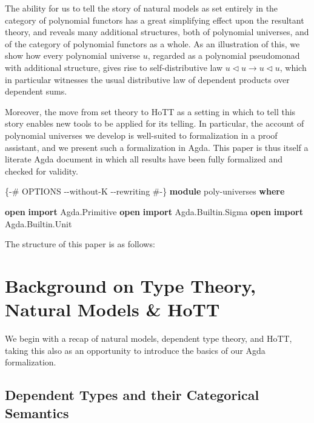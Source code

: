 \documentclass[
  11pt,
  oneside,
  article]{memoir}
\newenvironment{Shaded}{}{}
\newcommand{\KeywordTok}[1]{\textcolor[rgb]{0.00,0.44,0.13}{\textbf{#1}}}
\newcommand{\NormalTok}[1]{#1}
\newcommand{\OtherTok}[1]{\textcolor[rgb]{0.00,0.44,0.13}{#1}}
\newcommand{\PreprocessorTok}[1]{\textcolor[rgb]{0.74,0.48,0.00}{#1}}
\theoremstyle{definition}
\theoremstyle{plain}
\newcommand{\0}{\textsf{0}}
\newcommand{\1}{\tn{\textsf{1}}}
\newcommand{\tri}{\mathbin{\triangleleft}}
\begin{document}
The ability for us to tell the story of natural models as set entirely
in the category of polynomial functors has a great simplifying effect
upon the resultant theory, and reveals many additional structures, both
of polynomial universes, and of the category of polynomial functors as a
whole. As an illustration of this, we show how every polynomial universe
\(u\), regarded as a polynomial pseudomonad with additional structure,
gives rise to self-distributive law \(u\tri u\to u\tri u\), which in
particular witnesses the usual distributive law of dependent products
over dependent sums.

Moreover, the move from set theory to HoTT as a setting in which to tell
this story enables new tools to be applied for its telling. In
particular, the account of polynomial universes we develop is
well-suited to formalization in a proof assistant, and we present such a
formalization in Agda. This paper is thus itself a literate Agda
document in which all results have been fully formalized and checked for
validity.

\begin{Shaded}
\begin{Highlighting}[]
\PreprocessorTok{\{{-}\# OPTIONS {-}{-}without{-}K {-}{-}rewriting \#{-}\}}
\KeywordTok{module}\NormalTok{ poly{-}universes }\KeywordTok{where}

\KeywordTok{open} \KeywordTok{import}\NormalTok{ Agda}\OtherTok{.}\NormalTok{Primitive}
\KeywordTok{open} \KeywordTok{import}\NormalTok{ Agda}\OtherTok{.}\NormalTok{Builtin}\OtherTok{.}\NormalTok{Sigma}
\KeywordTok{open} \KeywordTok{import}\NormalTok{ Agda}\OtherTok{.}\NormalTok{Builtin}\OtherTok{.}\NormalTok{Unit}
\end{Highlighting}
\end{Shaded}

The structure of this paper is as follows:

\chapter{Background on Type Theory, Natural Models \&
HoTT}\label{background-on-type-theory-natural-models-hott}

We begin with a recap of natural models, dependent type theory, and
HoTT, taking this also as an opportunity to introduce the basics of our
Agda formalization.

\section{Dependent Types and their Categorical
Semantics}\label{dependent-types-and-their-categorical-semantics}
\end{document}
